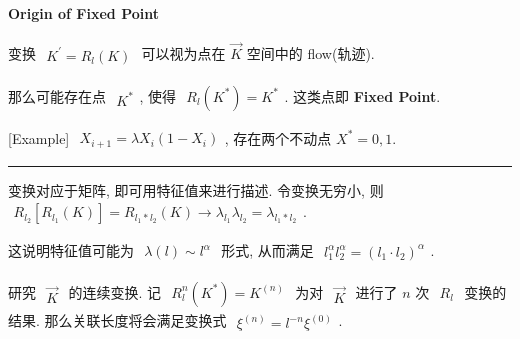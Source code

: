 \documentclass[../../main.tex]{subfiles}
\begin{document}
\paragraph{Origin of Fixed Point}
变换 $\begin{aligned}
    K^{\prime} = R_{l}(K)
\end{aligned}$ 可以视为点在 $\vec{K}$ 空间中的 flow(轨迹). 

那么可能存在点 $\begin{aligned}
    K^{*}
\end{aligned}$, 使得 $\begin{aligned}
    R_{l}(K^{*}) = K^{*}
\end{aligned}$. 这类点即 \textbf{Fixed Point}. 

[Example] $\begin{aligned}
    X_{i+1} = \lambda X_{i}(1-X_{i})
\end{aligned}$, 存在两个不动点 $X^{*}=0,1$. 

\vspace{0.5em}\hrule\vspace{0.5em}
变换对应于矩阵, 即可用特征值来进行描述. 令变换无穷小, 则 $\begin{aligned}
    R_{l_{2}}[R_{l_{1}}(K)] = R_{l_{1}*l_{2}}(K)\longrightarrow\lambda_{l_{1}}\lambda_{l_{2}} = \lambda_{l_{1}*l_{2}}
\end{aligned}$. 

这说明特征值可能为 $\begin{aligned}
    \lambda(l)\sim l^{\alpha}
\end{aligned}$ 形式, 从而满足 $\begin{aligned}
    l_{1}^{\alpha}l_{2}^{\alpha} = (l_{1}\cdot l_{2})^{\alpha}
\end{aligned}$. 

研究 $\begin{aligned}
    \vec{K}
\end{aligned}$ 的连续变换. 记 $\begin{aligned}
    R_{l}^{n}(K^{*}) = K^{(n)}
\end{aligned}$ 为对 $\begin{aligned}
    \vec{K}
\end{aligned}$ 进行了 $n$ 次 $\begin{aligned}
    R_{l}
\end{aligned}$ 变换的结果. 那么关联长度将会满足变换式 $\begin{aligned}
    \xi^{(n)} = l^{-n}\xi^{(0)}
\end{aligned}$. 
\end{document}
